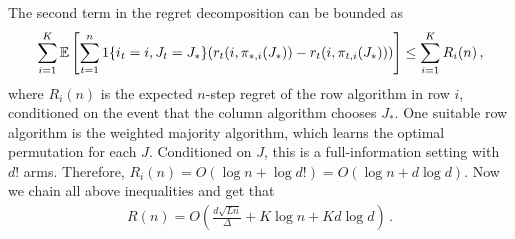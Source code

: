 The second term in the regret decomposition can be bounded as
\begin{align*}
  \sum_{i = 1}^K \mathbb{E}\left[\sum_{t = 1}^n 1\{i_t = i, J_t = J_\ast\} (r_t(i, \pi_{\ast, i}(J_\ast)) - r_t(i, \pi_{t, i}(J_\ast)))\right] \leq
  \sum_{i = 1}^K R_i(n)\,,
\end{align*}
where $R_i(n)$ is the expected $n$-step regret of the row algorithm in row $i$, conditioned on the event that the column algorithm chooses $J_\ast$. One suitable row algorithm is the weighted majority algorithm, which learns the optimal permutation for each $J$. Conditioned on $J$, this is a full-information setting with $d!$ arms. Therefore, $R_i(n) = O(\log n + \log d!) = O(\log n + d \log d)$. Now we chain all above inequalities and get that
\begin{align*}
  R(n) = O\left(\frac{d \sqrt{L n}}{\Delta} + K \log n + K d \log d\right)\,.
\end{align*}


